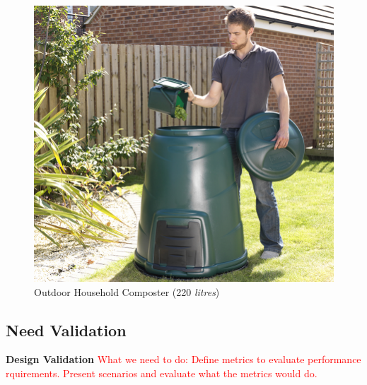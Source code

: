 \documentclass[a4paper,11pt,fleqn]{report}
\begin{document}
\begin{figure}[h!]
\begin{center}
\includegraphics[scale = 1.1]{Outdoor_Composter.jpg}
\caption{Outdoor Household Composter (220 \textit{litres})}
\label{fig: Outdoor Composter}
\end{center}
\end{figure}

\subsection{Need Validation}
\textbf{Design Validation}
\textcolor{red}{What we need to do: Define metrics to evaluate performance rquirements. Present scenarios and evaluate what the metrics would do.}\\
\end{document}
